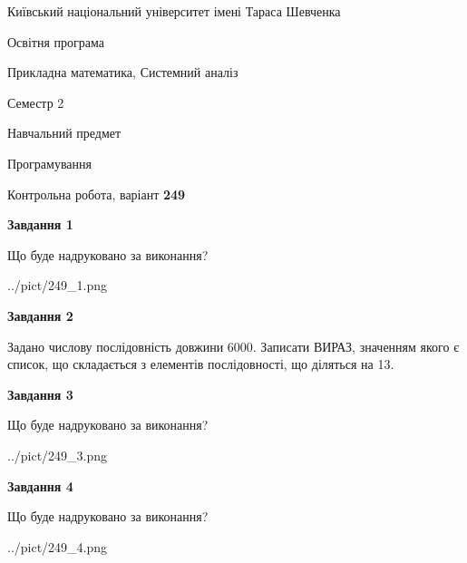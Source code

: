 \documentclass[12pt, ukrainian]{article}
\begin{document}
{{\begin {small}\par
{ \center  Київський національний університет імені Тараса Шевченка \par}
{\parbox {5 cm}{Освітня програма \hfill}{\parbox {8 cm}{Прикладна математика, Системний аналіз \hfill}}\parbox {5 cm}{\hfill Семестр 2}}\par
{\parbox {5 cm} {Навчальний предмет \hfill}\parbox {7 cm}{Програмування \hfill}\parbox {6cm}{\hfill}\par}\vspace{-7pt} \end{small}}{\center Контрольна робота, варіант  \No \textbf
{ 249 }\par}}
{
\begin {large}
{\begin {center}\textbf{Завдання 1}\end {center}}\par
Що буде надруковано за виконання?\par\par
\begin{center}
	{../pict/249_1.png}
\end{center}
\newpage

{\begin {center}\textbf{Завдання 2}\end {center}}\par

 Задано числову послідовність  довжини 6000. Записати ВИРАЗ, значенням якого є список, що складається з елементів послідовності, що діляться на 13.\par
\newpage

{\begin {center}\textbf{Завдання 3}\end {center}}\par
Що буде надруковано за виконання?\par
\begin{center}
	{../pict/249_3.png}
\end{center}
\newpage

{\begin {center}\textbf{Завдання 4}\end {center}}\par
Що буде надруковано за виконання?\par
\begin{center}
	{../pict/249_4.png}
\end{center}
\newpage


\end{large}}
\end{document}
